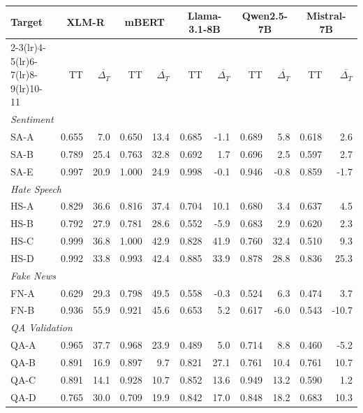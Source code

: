 \begin{tabular}{lrrrrrrrrrr}
\toprule
Target & \multicolumn{2}{c}{XLM-R} & \multicolumn{2}{c}{mBERT} & \multicolumn{2}{c}{Llama-3.1-8B} & \multicolumn{2}{c}{Qwen2.5-7B} & \multicolumn{2}{c}{Mistral-7B} \\
\cmidrule(lr){2-3}\cmidrule(lr){4-5}\cmidrule(lr){6-7}\cmidrule(lr){8-9}\cmidrule(lr){10-11}
 & TT & $\overline{\Delta_T}$ & TT & $\overline{\Delta_T}$ & TT & $\overline{\Delta_T}$ & TT & $\overline{\Delta_T}$ & TT & $\overline{\Delta_T}$ \\
\midrule
\multicolumn{11}{l}{\textit{Sentiment}} \\
SA-A & 0.655 & 7.0 & 0.650 & 13.4 & 0.685 & -1.1 & 0.689 & 5.8 & 0.618 & 2.6 \\
SA-B & 0.789 & 25.4 & 0.763 & 32.8 & 0.692 & 1.7 & 0.696 & 2.5 & 0.597 & 2.7 \\
SA-E & 0.997 & 20.9 & 1.000 & 24.9 & 0.998 & -0.1 & 0.946 & -0.8 & 0.859 & -1.7 \\
\midrule
\multicolumn{11}{l}{\textit{Hate Speech}} \\
HS-A & 0.829 & 36.6 & 0.816 & 37.4 & 0.704 & 10.1 & 0.680 & 3.4 & 0.637 & 4.5 \\
HS-B & 0.792 & 27.9 & 0.781 & 28.6 & 0.552 & -5.9 & 0.683 & 2.9 & 0.620 & 2.3 \\
HS-C & 0.999 & 36.8 & 1.000 & 42.9 & 0.828 & 41.9 & 0.760 & 32.4 & 0.510 & 9.3 \\
HS-D & 0.992 & 33.8 & 0.993 & 42.4 & 0.885 & 33.9 & 0.878 & 28.8 & 0.836 & 25.3 \\
\midrule
\multicolumn{11}{l}{\textit{Fake News}} \\
FN-A & 0.629 & 29.3 & 0.798 & 49.5 & 0.558 & -0.3 & 0.524 & 6.3 & 0.474 & 3.7 \\
FN-B & 0.936 & 55.9 & 0.921 & 45.6 & 0.653 & 5.2 & 0.617 & -6.0 & 0.543 & -10.7 \\
\midrule
\multicolumn{11}{l}{\textit{QA Validation}} \\
QA-A & 0.965 & 37.7 & 0.968 & 23.9 & 0.489 & 5.0 & 0.714 & 8.8 & 0.460 & -5.2 \\
QA-B & 0.891 & 16.9 & 0.897 & 9.7 & 0.821 & 27.1 & 0.761 & 10.4 & 0.761 & 10.7 \\
QA-C & 0.891 & 14.1 & 0.928 & 10.7 & 0.852 & 13.6 & 0.949 & 13.2 & 0.590 & 1.2 \\
QA-D & 0.765 & 30.0 & 0.709 & 19.9 & 0.842 & 17.0 & 0.848 & 18.2 & 0.683 & 10.3 \\
\bottomrule
\end{tabular}
